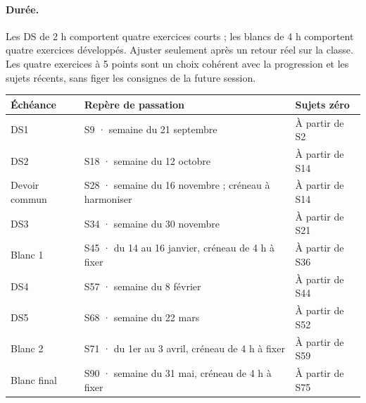 \paragraph{Durée.} Les DS de 2 h comportent quatre exercices courts ; les blancs de 4 h comportent quatre exercices développés. Ajuster seulement après un retour réel sur la classe. Les quatre exercices à 5 points sont un choix cohérent avec la progression et les sujets récents, sans figer les consignes de la future session.
\fi
\begin{longtable}{@{}p{}p{}p{}@{}}\toprule\textbf{Échéance}&\textbf{Repère de passation}&\textbf{Sujets zéro}\\\midrule\endhead


DS1&S9 · semaine du 21 septembre&À partir de S2\\[3pt]

DS2&S18 · semaine du 12 octobre&À partir de S14\\[3pt]

Devoir commun&S28 · semaine du 16 novembre ; créneau à harmoniser&À partir de S14\\[3pt]

DS3&S34 · semaine du 30 novembre&À partir de S21\\[3pt]

Blanc 1&S45 · du 14 au 16 janvier, créneau de 4 h à fixer&À partir de S36\\[3pt]

DS4&S57 · semaine du 8 février&À partir de S44\\[3pt]

DS5&S68 · semaine du 22 mars&À partir de S52\\[3pt]

Blanc 2&S71 · du 1er au 3 avril, créneau de 4 h à fixer&À partir de S59\\[3pt]

Blanc final&S90 · semaine du 31 mai, créneau de 4 h à fixer&À partir de S75\\[3pt]

\bottomrule\end{longtable}

